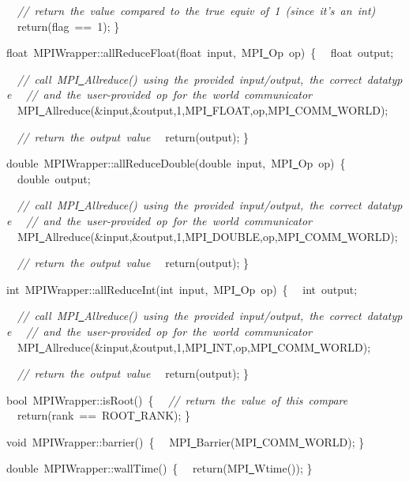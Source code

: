 {\ \ \textsl{//\ return\ the\ value\ compared\ to\ the\ true\ equiv\ of\ 1\ (since\ it's\ an\ int)}
\ \ return(flag\ ==\ 1);
\}

float\ MPIWrapper::allReduceFloat(float\ input,\ MPI\underline\ Op\ op)\ \{
\ \ float\ output;

\ \ \textsl{//\ call\ MPI\underline\ Allreduce()\ using\ the\ provided\ input/output,\ the\ correct\ datatype}
\ \ \textsl{//\ and\ the\ user-{}provided\ op\ for\ the\ world\ communicator}
\ \ MPI\underline\ Allreduce(\&input,\&output,1,MPI\underline\ FLOAT,op,MPI\underline\ COMM\underline\ WORLD);

\ \ \textsl{//\ return\ the\ output\ value}
\ \ return(output);
\}

double\ MPIWrapper::allReduceDouble(double\ input,\ MPI\underline\ Op\ op)\ \{
\ \ double\ output;

\ \ \textsl{//\ call\ MPI\underline\ Allreduce()\ using\ the\ provided\ input/output,\ the\ correct\ datatype}
\ \ \textsl{//\ and\ the\ user-{}provided\ op\ for\ the\ world\ communicator}
\ \ MPI\underline\ Allreduce(\&input,\&output,1,MPI\underline\ DOUBLE,op,MPI\underline\ COMM\underline\ WORLD);

\ \ \textsl{//\ return\ the\ output\ value}
\ \ return(output);
\}

int\ MPIWrapper::allReduceInt(int\ input,\ MPI\underline\ Op\ op)\ \{
\ \ int\ output;

\ \ \textsl{//\ call\ MPI\underline\ Allreduce()\ using\ the\ provided\ input/output,\ the\ correct\ datatype}
\ \ \textsl{//\ and\ the\ user-{}provided\ op\ for\ the\ world\ communicator}
\ \ MPI\underline\ Allreduce(\&input,\&output,1,MPI\underline\ INT,op,MPI\underline\ COMM\underline\ WORLD);

\ \ \textsl{//\ return\ the\ output\ value}
\ \ return(output);
\}

bool\ MPIWrapper::isRoot()\ \{
\ \ \textsl{//\ return\ the\ value\ of\ this\ compare}
\ \ return(rank\ ==\ ROOT\underline\ RANK);
\}

void\ MPIWrapper::barrier()\ \{
\ \ MPI\underline\ Barrier(MPI\underline\ COMM\underline\ WORLD);
\}

double\ MPIWrapper::wallTime()\ \{
\ \ return(MPI\underline\ Wtime());
\}

 }
\normalfont\normalsize


